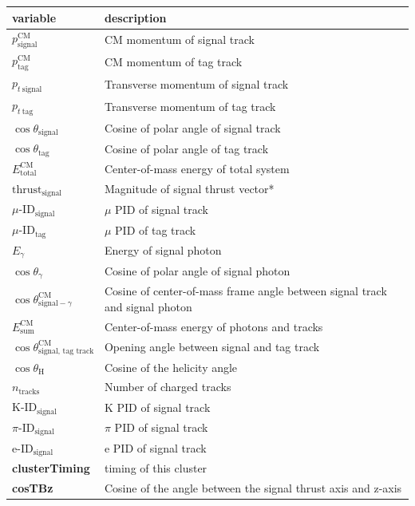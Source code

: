 \documentclass[12pt]{thesis}  %
\begin{document}
\begin{table}[h]
\centering
\begin{tabular}{ll}
\textbf{variable} & \textbf{description} \\ \hline
$p_{\text{signal}}^{\text{CM}}$  & CM momentum of signal track \\
$p_{\text{tag}}^{\text{CM}}$  & CM momentum of tag track  \\
$p_{t~\text{signal}}$ & Transverse momentum of signal track \\
$p_{t~\text{tag}}$ & Transverse momentum of tag track  \\
$\cos\theta_{\text{signal}}$ & Cosine of polar angle of signal track  \\
$\cos\theta_{\text{tag}}$ & Cosine of polar angle of tag track  \\
$E_{\text{total}}^{\text{CM}}$ & Center-of-mass energy of total system    \\
$\text{thrust}_{\text{signal}}$ & Magnitude of signal thrust vector* \\
$\mu\text{-ID}_{\text{signal}}$ & $\mu$ PID of signal track  \\
$\mu\text{-ID}_{\text{tag}}$ & $\mu$ PID of tag track  \\
$E_{\gamma}$ & Energy of signal photon   \\
$\cos\theta_{\gamma}$ & Cosine of polar angle of signal photon   \\
$\cos\theta^{\text{CM}}_{\text{signal}-\gamma}$ & Cosine of center-of-mass frame angle between signal track and signal photon \\
$E_{\text{sum}}^{\text{CM}}$ & Center-of-mass energy of photons and tracks  \\
$\cos\theta^{\text{CM}}_{\text{signal, tag track}}$ & Opening angle between signal and tag track  \\
$\cos\theta_{\text{H}}$ & Cosine of the helicity angle \\
$n_{\text{tracks}}$ & Number of charged tracks  \\
$\text{K-ID}_{\text{signal}}$ & K PID of signal track\\
$\pi\text{-ID}_{\text{signal}}$ & $\pi$ PID of signal track \\
$\text{e-ID}_{\text{signal}}$ & e PID of signal track  \\
\textbf{clusterTiming} & timing of this cluster   \\
\textbf{cosTBz} & Cosine of the angle between the signal thrust axis and z-axis   \\

\end{tabular}
\end{table}
\end{document}
